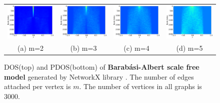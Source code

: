 \documentclass[senior,final,11pt]{iscs-thesis}
\begin{document}
\begin{figure}[htbp]
\begin{tabular}{cccc}
    \includegraphics[width=45mm]{figure/barabasi_albert_graph_n3000_m2txt_pdos.png} &
    \includegraphics[width=45mm]{figure/barabasi_albert_graph_n3000_m3txt_pdos.png} &
    \includegraphics[width=45mm]{figure/barabasi_albert_graph_n3000_m4txt_pdos.png} &
    \includegraphics[width=45mm]{figure/barabasi_albert_graph_n3000_m5txt_pdos.png} \\
    (a) m=2 & (b) m=3 & (c) m=4 & (d) m=5\\ [6pt]
  \end{tabular}
  \caption{DOS(top) and PDOS(bottom) of {\bf Barabási-Albert scale free model} \cite{barabasi1999emergence} generated by NetworkX library \cite{SciPyProceedings_11}. The number of edges attached per vertex is $m$. The number of vertices in all graphs is 3000.}
  \label{fig:barabasi}
\end{figure}
\end{document}
